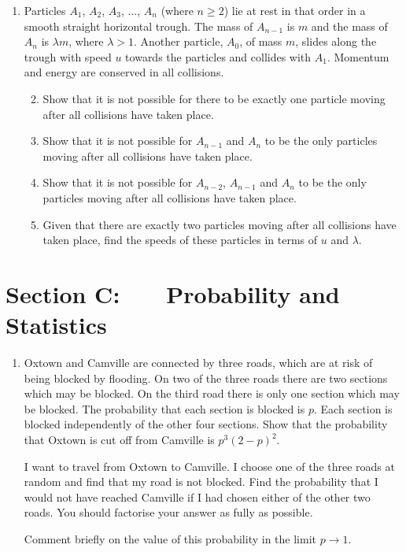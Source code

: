 \documentclass[a4, 11pt]{report}
\newlength{\qspace}
\newcounter{qnumber}
\newenvironment{question}%
 {\vspace{\qspace}
  \begin{enumerate}[\bfseries 1\quad][10]%
    \setcounter{enumi}{\value{qnumber}}%
    \item%
 }
{
  \end{enumerate}
  \filbreak
  \stepcounter{qnumber}
 }
\newenvironment{questionparts}[1][1]%
 {
  \begin{enumerate}[\bfseries (i)]%
    \setcounter{enumii}{#1}
    \addtocounter{enumii}{-1}
    \setlength{\itemsep}{5mm}
    \setlength{\parskip}{8pt}
 }
 {
  \end{enumerate}
 }
\def\ge{\geqslant}
\def\l{\left(}
\def\r{\right)}
\begin{document}

\begin{question}
Particles  $A_1$, $A_2$, $A_3$, 
$\ldots$, $A_n$ (where $n\ge 2$) lie at rest in that order in a smooth straight horizontal
trough. The mass of $A_{n-1}$ is $m$ and the mass of $A_n$ is
$\lambda m$, where $\lambda>1$.
Another particle, $A_0$, of mass $m$, 
slides along the trough with speed $u$ towards the particles and collides with  $A_1$. 
Momentum and energy are conserved in all  collisions.


\begin{questionparts}
\item Show that 
it is not possible for  there to be exactly one particle 
moving after all collisions have taken place.
\item Show that 
it is not possible for  $A_{n-1}$ and $A_n$ to be the only particles
moving after all collisions have taken place.
\item Show that 
it is not possible for  $A_{n-2}$, $A_{n-1}$ and $A_n$ to be the only particles
moving after all collisions have taken place.
\item Given that there are exactly two 
particles 
moving after all collisions have taken place, find the speeds of these
particles in terms of $u$ and $\lambda$.
\end{questionparts}
\end{question}
	

	
	\newpage
\section*{Section C: \ \ \ Probability and Statistics}


\begin{question}
Oxtown and Camville are connected by three roads, 
which are at risk of being blocked by flooding. 
On two of the three roads there are two sections 
which may be blocked. On the third road 
there is only one section which may be blocked. 
The probability that each section is blocked is $p$. 
Each section is blocked independently of the other four sections. 
Show that the probability that Oxtown is cut off from 
Camville is $p^3 \l 2-p \r^2$.

I want to travel from Oxtown to Camville. I choose 
one of the three roads at random and find that my road is not blocked. 
Find the probability that I would not have reached Camville
if I had chosen either of the other two roads.
You should factorise your answer as fully as possible. 

Comment briefly on the value of this probability in the limit $p\to1$.
\end{question}
\end{document}
